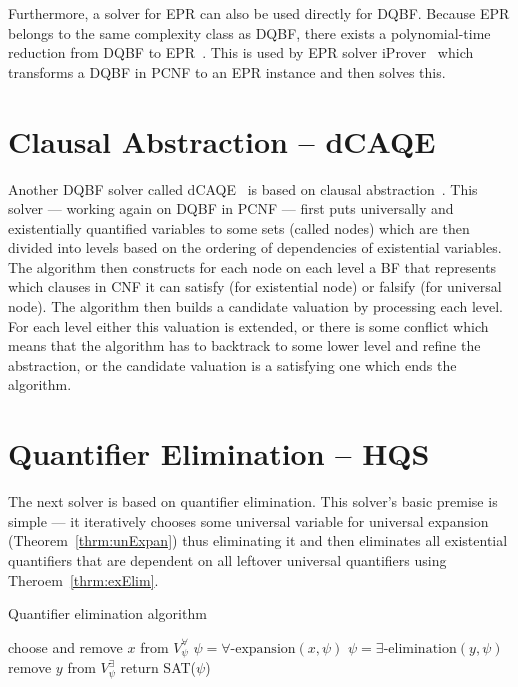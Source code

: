 \documentclass[
  digital, %
  color,
  twoside, %
  table,   %
  nolof,     %
  nolot,     %
]{fithesis3}
\theoremstyle{definition}
\theoremstyle{remark}
\newcommand{\evars}[1]{V_{#1}^{\exists}}
\newcommand{\uvars}[1]{V_{#1}^{\forall}}
\begin{document}
Furthermore, a solver for EPR can also be used directly for DQBF. Because EPR belongs to the same complexity class as DQBF, there exists a polynomial-time reduction from DQBF to EPR~\cite{iDQandDQDIMACS}. This is used by EPR solver iProver~\cite{iProver} which transforms a DQBF in PCNF to an EPR instance and then solves this.

\section{Clausal Abstraction -- dCAQE}
Another DQBF solver called dCAQE~\cite{dCAQE} is based on clausal abstraction~\cite{ClausalAbstr}. This solver --- working again on DQBF in PCNF --- first puts universally and existentially quantified variables to some sets (called nodes) which are then divided into levels based on the ordering of dependencies of existential variables. The algorithm then constructs for each node on each level a BF that represents which clauses in CNF it can satisfy (for existential node) or falsify (for universal node). The algorithm then builds a candidate valuation by processing each level. For each level either this valuation is extended, or there is some conflict which means that the algorithm has to backtrack to some lower level and refine the abstraction, or the candidate valuation is a satisfying one which ends the algorithm.

\section{Quantifier Elimination -- HQS}
The next solver is based on quantifier elimination. This solver's basic premise is simple --- it iteratively chooses some universal variable for universal expansion (Theorem~\ref{thrm:unExpan}) thus eliminating it and then eliminates all existential quantifiers that are dependent on all leftover universal quantifiers using Theroem~\ref{thrm:exElim}.

\begin{algorithm}
\caption{Quantifier elimination algorithm}
\label{alg:QE}
\begin{algorithmic}[1]
\While{$\uvars{\psi}$ is not empty}%
    \State choose and remove $x$ from $\uvars{\psi}$
    \State $\psi = \forall\text{-expansion}(x,\psi)$%
    \ForAll{$y \in \evars{\psi}$ s. t. $D_y = \uvars{\psi}$} %
        \State $\psi = \exists\text{-elimination}(y,\psi)$%
        \State remove $y$ from $\evars{\psi}$
    \EndFor
\EndWhile
\State return SAT($\psi$)
\EndFunction
\end{algorithmic}
\end{algorithm}
\end{document}
